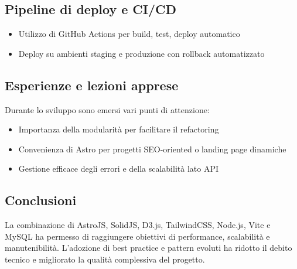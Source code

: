 \subsection{Pipeline di deploy e CI/CD}
\begin{itemize}
    \item Utilizzo di GitHub Actions per build, test, deploy automatico
    \item Deploy su ambienti staging e produzione con rollback automatizzato
\end{itemize}

\subsection{Esperienze e lezioni apprese}
Durante lo sviluppo sono emersi vari punti di attenzione:
\begin{itemize}
    \item Importanza della modularità per facilitare il refactoring
    \item Convenienza di Astro per progetti SEO-oriented o landing page dinamiche
    \item Gestione efficace degli errori e della scalabilità lato API
\end{itemize}

\subsection{Conclusioni}
La combinazione di AstroJS, SolidJS, D3.js, TailwindCSS, Node.js, Vite e MySQL ha permesso di raggiungere obiettivi di performance, scalabilità e manutenibilità. L’adozione di best practice e pattern evoluti ha ridotto il debito tecnico e migliorato la qualità complessiva del progetto.
